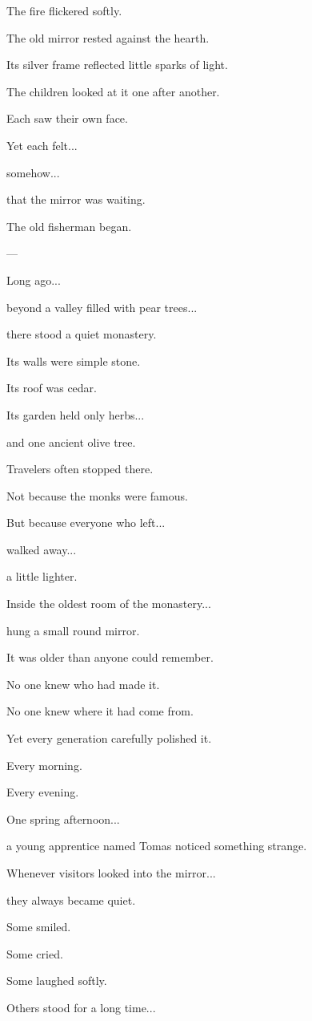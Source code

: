 \documentclass[12pt,openany]{book}
\begin{document}
The fire flickered softly.

The old mirror rested against the hearth.

Its silver frame reflected little sparks of light.

The children looked at it one after another.

Each saw their own face.

Yet each felt...

somehow...

that the mirror was waiting.

The old fisherman began.

---

Long ago...

beyond a valley filled with pear trees...

there stood a quiet monastery.

Its walls were simple stone.

Its roof was cedar.

Its garden held only herbs...

and one ancient olive tree.

Travelers often stopped there.

Not because the monks were famous.

But because everyone who left...

walked away...

a little lighter.

Inside the oldest room of the monastery...

hung a small round mirror.

It was older than anyone could remember.

No one knew who had made it.

No one knew where it had come from.

Yet every generation carefully polished it.

Every morning.

Every evening.

One spring afternoon...

a young apprentice named Tomas noticed something strange.

Whenever visitors looked into the mirror...

they always became quiet.

Some smiled.

Some cried.

Some laughed softly.

Others stood for a long time...
\end{document}
